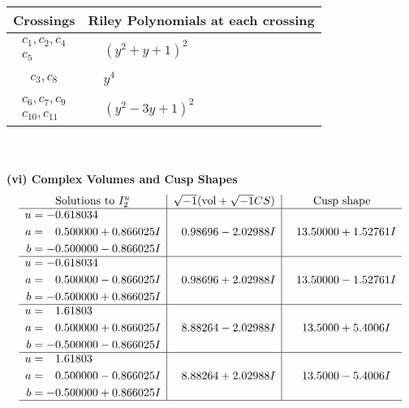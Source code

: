 \documentclass[1p]{elsarticle_modified}
\theoremstyle{definition}
\newcommand{\I}{\sqrt{-1}}
\begin{document}
\begin{tabular}{m{50pt}|m{274pt}}
Crossings & \hspace{64pt}Riley Polynomials at each crossing \\
\hline $$\begin{aligned}c_{1},c_{2},c_{4}\\c_{5}\end{aligned}$$&$\begin{aligned}
&(y^2+y+1)^2
\end{aligned}$\\
\hline $$\begin{aligned}c_{3},c_{8}\end{aligned}$$&$\begin{aligned}
&y^4
\end{aligned}$\\
\hline $$\begin{aligned}c_{6},c_{7},c_{9}\\c_{10},c_{11}\end{aligned}$$&$\begin{aligned}
&(y^2-3 y+1)^2
\end{aligned}$\\
\hline
\end{tabular}\\~\\
\newpage\flushleft \textbf{(vi) Complex Volumes and Cusp Shapes}
$$\begin{array}{c|c|c}  
\text{Solutions to }I^u_{2}& \I (\text{vol} + \sqrt{-1}CS) & \text{Cusp shape}\\
 \hline 
\begin{aligned}
u &= -0.618034\phantom{ +0.000000I} \\
a &= \phantom{-}0.500000 + 0.866025 I \\
b &= -0.500000 - 0.866025 I\end{aligned}
 & \phantom{-}0.98696 - 2.02988 I & \phantom{-}13.50000 + 1.52761 I \\ \hline\begin{aligned}
u &= -0.618034\phantom{ +0.000000I} \\
a &= \phantom{-}0.500000 - 0.866025 I \\
b &= -0.500000 + 0.866025 I\end{aligned}
 & \phantom{-}0.98696 + 2.02988 I & \phantom{-}13.50000 - 1.52761 I \\ \hline\begin{aligned}
u &= \phantom{-}1.61803\phantom{ +0.000000I} \\
a &= \phantom{-}0.500000 + 0.866025 I \\
b &= -0.500000 - 0.866025 I\end{aligned}
 & \phantom{-}8.88264 - 2.02988 I & \phantom{-}13.5000 + 5.4006 I \\ \hline\begin{aligned}
u &= \phantom{-}1.61803\phantom{ +0.000000I} \\
a &= \phantom{-}0.500000 - 0.866025 I \\
b &= -0.500000 + 0.866025 I\end{aligned}
 & \phantom{-}8.88264 + 2.02988 I & \phantom{-}13.5000 - 5.4006 I\\
 \hline 
 \end{array}$$\newpage
\end{document}
